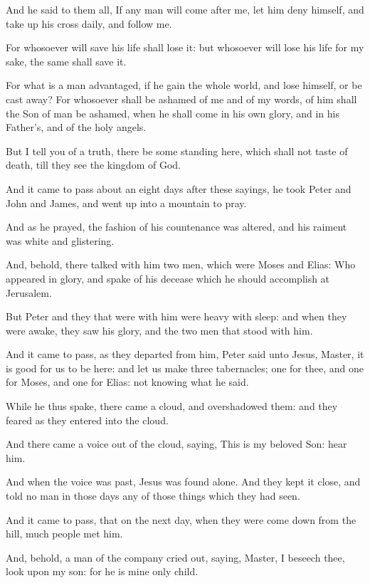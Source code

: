 \verse And he said to them all, If any man will come after me, let him deny himself, and take up his cross daily, and follow me.

\verse For whosoever will save his life shall lose it: but whosoever will lose his life for my sake, the same shall save it.

\verse For what is a man advantaged, if he gain the whole world, and lose himself, or be cast away?  \verse For whosoever shall be ashamed of me and of my words, of him shall the Son of man be ashamed, when he shall come in his own glory, and in his Father's, and of the holy angels.

\verse But I tell you of a truth, there be some standing here, which shall not taste of death, till they see the kingdom of God.

\verse And it came to pass about an eight days after these sayings, he took Peter and John and James, and went up into a mountain to pray.

\verse And as he prayed, the fashion of his countenance was altered, and his raiment was white and glistering.

\verse And, behold, there talked with him two men, which were Moses and Elias: \verse Who appeared in glory, and spake of his decease which he should accomplish at Jerusalem.

\verse But Peter and they that were with him were heavy with sleep: and when they were awake, they saw his glory, and the two men that stood with him.

\verse And it came to pass, as they departed from him, Peter said unto Jesus, Master, it is good for us to be here: and let us make three tabernacles; one for thee, and one for Moses, and one for Elias: not knowing what he said.

\verse While he thus spake, there came a cloud, and overshadowed them: and they feared as they entered into the cloud.

\verse And there came a voice out of the cloud, saying, This is my beloved Son: hear him.

\verse And when the voice was past, Jesus was found alone. And they kept it close, and told no man in those days any of those things which they had seen.

\verse And it came to pass, that on the next day, when they were come down from the hill, much people met him.

\verse And, behold, a man of the company cried out, saying, Master, I beseech thee, look upon my son: for he is mine only child.

